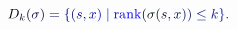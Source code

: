 \documentclass[12pt]{article}
\begin{document}
\makeatletter
\renewcommand*{\@textcolor}[3]{%
  \protect\leavevmode
  \begingroup
    \color#1{#2}#3%
  \endgroup
}
\makeatother
\begin{displaymath}
\mathcolor[RGB]{0,0,15}{D} _ { \mathcolor[RGB]{0,0,30}{k} } \mathcolor[RGB]{0,0,45}{(} \mathcolor[RGB]{0,0,60}{\sigma} \mathcolor[RGB]{0,0,75}{)} \mathcolor[RGB]{0,0,90}{=} \mathcolor[RGB]{0,0,105}{\{} \mathcolor[RGB]{0,0,120}{(} \mathcolor[RGB]{0,0,135}{s} \mathcolor[RGB]{0,0,150}{,} \mathcolor[RGB]{0,0,165}{x} \mathcolor[RGB]{0,0,180}{)} \mathcolor[RGB]{0,0,195}{\mid} \mathrm { \mathcolor[RGB]{0,0,210}{r} \mathcolor[RGB]{0,0,225}{a} \mathcolor[RGB]{0,0,240}{n} \mathcolor[RGB]{0,0,255}{k} } \mathcolor[RGB]{0,15,0}{(} \mathcolor[RGB]{0,15,15}{\sigma} \mathcolor[RGB]{0,15,30}{(} \mathcolor[RGB]{0,15,45}{s} \mathcolor[RGB]{0,15,60}{,} \mathcolor[RGB]{0,15,75}{x} \mathcolor[RGB]{0,15,90}{)} \mathcolor[RGB]{0,15,105}{)} \mathcolor[RGB]{0,15,120}{\leq} \mathcolor[RGB]{0,15,135}{k} \mathcolor[RGB]{0,15,150}{\}} \mathcolor[RGB]{0,15,165}{.}
\end{displaymath}
\end{document}
